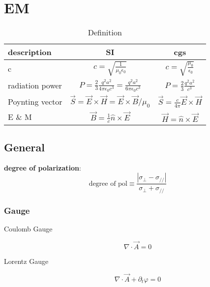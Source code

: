 \chapter{EM}

\renewcommand{\arraystretch}{2}
\begin{table}[h]
    \caption{Definition}
    \label{tab:def}
    \begin{center}
	\begin{tabular}{l | c | c}
	    \hline 
	    description	& SI	& cgs	\\
	    \hline
	    c	& $\displaystyle c = \sqrt{\frac{1}{\mu_0\epsilon_0}}$ & $\displaystyle c = \sqrt{\frac{\mu_0}{\epsilon_0}}$\\
	    \hline
	    radiation power & $\displaystyle P = \frac{2}{3} \frac{q^2 a^2}{4\pi\epsilon_0 c^3} = \frac{q^2 a^2}{6\pi\epsilon_0c^3}$  & $\displaystyle P  = \frac{2}{3} \frac{q^2a^2}{c^3}$	\\
	    \hline
	    Poynting vector & $\vec{S} = \vec{E} \times \vec{H} = \vec{E} \times \vec{B} / \mu_0$   & $\displaystyle \vec{S} = \frac{c}{4\pi} \vec{E} \times \vec{H}$   \\
	    \hline
	    E \& M  & $\displaystyle \vec{B} = \frac{1}{c} \hat{n} \times \vec{E}$ & $\vec{H} = \hat{n} \times \vec{E}$	\\
	\end{tabular}
    \end{center}
\end{table}
\renewcommand{\arraystretch}{1}


\section{General}
\textbf{degree of polarization}:    \\
\begin{equation}
    \text{degree of pol} \equiv \frac{|\sigma_{\perp}-\sigma_{//}|}{\sigma_{\perp}+\sigma_{//}}
\end{equation}

\subsection{Gauge}
\begin{description}
    \item [Coulomb Gauge]
	\begin{equation}
	    \label{eqn:em::CoulombGauge}
	    \nabla\cdot\vec{A} = 0
	\end{equation}

    \item [Lorentz Gauge]
	\begin{equation}
	    \label{eqn:em::LorentzGauge}
	    \nabla\cdot\vec{A} + \partial_t\varphi = 0
	\end{equation}
\end{description}

